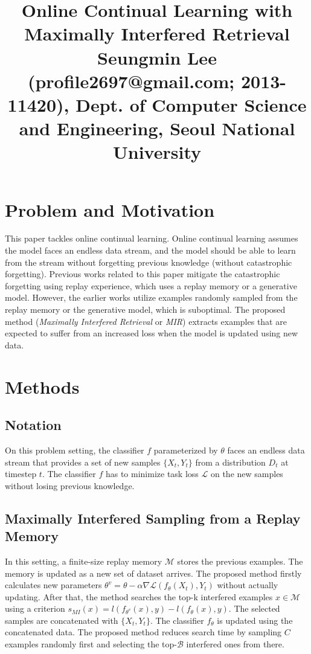 \documentclass[10pt,twocolumn,letterpaper]{article}
\begin{document}
\title{Online Continual Learning with Maximally Interfered Retrieval
	 \\ {\rm {\normalsize Seungmin Lee (profile2697@gmail.com; 2013-11420), Dept. of Computer Science and Engineering, Seoul National University}}} 

\maketitle
\thispagestyle{empty}


\section{Problem and Motivation}
This paper tackles online continual learning. Online continual learning assumes the model faces an endless data stream, and the model should be able to learn from the stream without forgetting previous knowledge (without catastrophic forgetting). Previous works related to this paper mitigate the catastrophic forgetting using replay experience, which uses a replay memory or a generative model. However, the earlier works utilize examples randomly sampled from the replay memory or the generative model, which is suboptimal. The proposed method (\textit{Maximally Interfered Retrieval} or \textit{MIR}) extracts examples that are expected to suffer from an increased loss when the model is updated using new data.

\section{Methods}
\subsection{Notation}
On this problem setting, the classifier $f$ parameterized by $\theta$ faces an endless data stream that provides a set of new samples $\{X_t, Y_t\}$ from a distribution $D_t$ at timestep $t$. The classifier $f$ has to minimize task loss $\mathcal{L}$ on the new samples without losing previous knowledge.

\subsection{Maximally Interfered Sampling from a Replay Memory}\label{ER}
In this setting, a finite-size replay memory $\mathcal{M}$ stores the previous examples. The memory is updated as a new set of dataset arrives. The proposed method firstly calculates new parameters $\theta^v= \theta-\alpha\nabla\mathcal{L}(f_\theta(X_t), Y_t)$ without actually updating. After that, the method searches the top-k interfered examples $x \in \mathcal{M}$ using a criterion $s_{MI}(x) = l(f_{\theta^v}(x),y) -l(f_{\theta}(x),y)$. The selected samples are concatenated with $\{X_t, Y_t\}$. The classifier $f_{\theta}$ is updated using the concatenated data. The proposed method reduces search time by sampling $C$ examples randomly first and selecting the top-$\mathcal{B}$ interfered ones from there.
\end{document}
